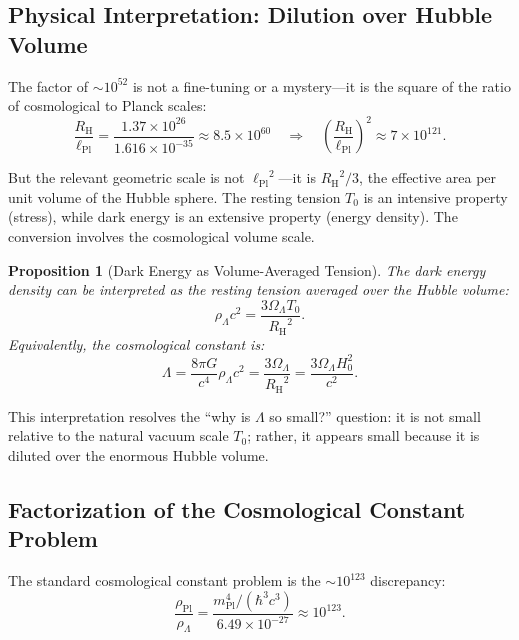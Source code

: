 \documentclass[11pt,a4paper]{article}
\newcommand{\lPl}{\ensuremath{\ell_{\mathrm{Pl}}}}
\newcommand{\rhoPl}{\ensuremath{\rho_{\mathrm{Pl}}}}
\newcommand{\Tzero}{\ensuremath{T_0}}
\newcommand{\RH}{\ensuremath{R_{\mathrm{H}}}}
\newcommand{\OmegaLam}{\ensuremath{\Omega_\Lambda}}
\newtheorem{proposition}[theorem]{Proposition}
\theoremstyle{definition}
\theoremstyle{remark}
\begin{document}
\subsection{Physical Interpretation: Dilution over Hubble Volume}
\label{sec:dilution_interpretation}

The factor of $\sim 10^{52}$ is not a fine-tuning or a mystery---it is the square of the ratio of cosmological to Planck scales:
\begin{equation}
\frac{\RH}{\lPl} = \frac{1.37 \times 10^{26}}{1.616 \times 10^{-35}} \approx 8.5 \times 10^{60} \quad \Rightarrow \quad \left(\frac{\RH}{\lPl}\right)^2 \approx 7 \times 10^{121}.
\end{equation}

But the relevant geometric scale is not $\lPl^2$---it is $\RH^2/3$, the effective area per unit volume of the Hubble sphere. The resting tension $\Tzero$ is an intensive property (stress), while dark energy is an extensive property (energy density). The conversion involves the cosmological volume scale.

\begin{proposition}[Dark Energy as Volume-Averaged Tension]
\label{prop:volume_averaged_tension}
The dark energy density can be interpreted as the resting tension averaged over the Hubble volume:
\begin{equation}
\rho_\Lambda c^2 = \frac{3\OmegaLam \Tzero}{\RH^2}.
\end{equation}
Equivalently, the cosmological constant is:
\begin{equation}
\Lambda = \frac{8\pi G}{c^4}\rho_\Lambda c^2 = \frac{3\OmegaLam}{\RH^2} = \frac{3\OmegaLam H_0^2}{c^2}.
\end{equation}
\end{proposition}

This interpretation resolves the ``why is $\Lambda$ so small?'' question: it is not small relative to the natural vacuum scale $\Tzero$; rather, it appears small because it is diluted over the enormous Hubble volume.

\subsection{Factorization of the Cosmological Constant Problem}
\label{sec:cc_factorization}

The standard cosmological constant problem is the $\sim 10^{123}$ discrepancy:
\begin{equation}
\frac{\rhoPl}{\rho_\Lambda} = \frac{m_{\mathrm{Pl}}^4/(\hbar^3 c^3)}{6.49 \times 10^{-27}} \approx 10^{123}.
\end{equation}
\end{document}
